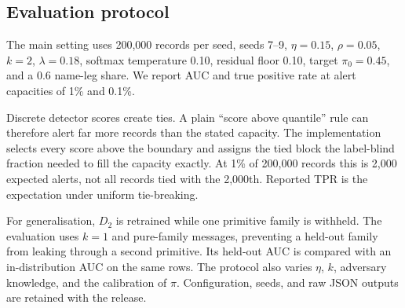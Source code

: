 \documentclass[conference]{IEEEtran}
\begin{document}
\subsection{Evaluation protocol}
The main setting uses 200,000 records per seed, seeds 7--9, $\eta=0.15$,
$\rho=0.05$, $k=2$, $\lambda=0.18$, softmax temperature 0.10, residual floor
0.10, target $\pi_0=0.45$, and a 0.6 name-leg share. We report AUC and true
positive rate at alert capacities of 1\% and 0.1\%.

Discrete detector scores create ties. A plain ``score above quantile'' rule can
therefore alert far more records than the stated capacity. The implementation
selects every score above the boundary and assigns the tied block the
label-blind fraction needed to fill the capacity exactly. At 1\% of 200,000
records this is 2,000 expected alerts, not all records tied with the 2,000th.
Reported TPR is the expectation under uniform tie-breaking.

For generalisation, $D_2$ is retrained while one primitive family is withheld.
The evaluation uses $k=1$ and pure-family messages, preventing a held-out
family from leaking through a second primitive. Its held-out AUC is compared
with an in-distribution AUC on the same rows. The protocol also varies $\eta$,
$k$, adversary knowledge, and the calibration of $\pi$. Configuration, seeds,
and raw JSON outputs are retained with the release.
\end{document}
